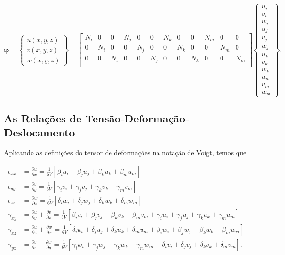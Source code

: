 \begin{equation}
    \bm{\varphi} = \begin{Bmatrix}
        u(x,y,z) \\
        v(x,y,z) \\
        w(x,y,z)
    \end{Bmatrix} = 
    \begin{bmatrix}
        N_i & 0   & 0   & N_j & 0   & 0   & N_k & 0   & 0   & N_m & 0   & 0 \\
        0   & N_i & 0   & 0   & N_j & 0   & 0   & N_k & 0   & 0   & N_m & 0 \\
        0   & 0   & N_i & 0   & 0   & N_j & 0   & 0   & N_k & 0   & 0   & N_m \\
    \end{bmatrix}
    \begin{Bmatrix}
        u_i \\ v_i \\ w_i \\ u_j \\ v_j \\ w_j \\ u_k \\ v_k \\ w_k \\ u_m \\ v_m \\ w_m
    \end{Bmatrix}.
\end{equation}

\subsection{As Relações de Tensão-Deformação-Deslocamento}

Aplicando as definições do tensor de deformações na notação de Voigt, temos que

\begin{align}
    \epsilon_{xx} &= \frac{\partial u}{\partial x} = \frac{1}{6V}[\beta_i u_i + \beta_j u_j + \beta_k u_k + \beta_m u_m] \\
    \epsilon_{yy} &= \frac{\partial v}{\partial y} = \frac{1}{6V}[\gamma_i v_i + \gamma_j v_j + \gamma_k v_k + \gamma_m v_m] \\
    \epsilon_{zz} &= \frac{\partial w}{\partial z} = \frac{1}{6V}[\delta_i w_i + \delta_j w_j + \delta_k w_k + \delta_m w_m] \\
    \gamma_{xy} &= \frac{\partial u}{\partial y} + \frac{\partial v}{\partial x} = \frac{1}{6V}[\beta_i v_i + \beta_j v_j + \beta_k v_k + \beta_m v_m + \gamma_i u_i + \gamma_j u_j + \gamma_k u_k + \gamma_m u_m] \\
    \gamma_{xz} &= \frac{\partial u}{\partial z} + \frac{\partial w}{\partial x} = \frac{1}{6V}[\delta_i u_i + \delta_j u_j + \delta_k u_k + \delta_m u_m + \beta_i w_i + \beta_j w_j + \beta_k w_k + \beta_m w_m] \\
    \gamma_{yz} &= \frac{\partial v}{\partial z} + \frac{\partial w}{\partial y} = \frac{1}{6V}[\gamma_i w_i + \gamma_j w_j + \gamma_k w_k + \gamma_m w_m + \delta_i v_i + \delta_j v_j + \delta_k v_k + \delta_m v_m].
\end{align}

